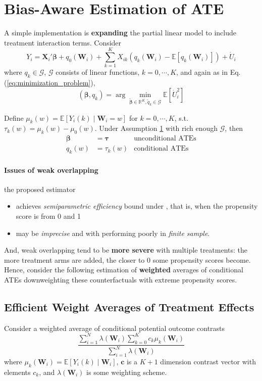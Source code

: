 \documentclass[twoside]{article}
\begin{document}
\section{Bias-Aware Estimation of ATE}
A simple implementation is \textbf{expanding} the partial linear model to include treatment interaction terms. Consider
\begin{equation}\label{eq:expanded_ATE_estimation}
    Y_i = \mathbf{X}_i'\boldsymbol{\beta} + q_0(\mathbf{W}_i) + \sum^K_{k=1}X_{ik}\left(q_k(\mathbf{W}_i)-\mathbb{E}\left[ q_k(\mathbf{W}_i) \right]\right) + \dot{U}_i
\end{equation}
where $q_k\in \mathcal{G}$, $\mathcal{G}$ consists of linear functions, $k=0,\cdots,K$, and again as in Eq. (\ref{eq:minimization_problem}), 
$$
(\boldsymbol{\beta},q_k) = \arg\min_{\tilde{\boldsymbol{\beta}}\in \mathbb{R}^K,\tilde{q}_k\in \mathcal{G}} \mathbb{E}\left[ \dot{U}_i^2 \right]
$$

Define $\mu_k(w) = \mathbb{E}\left[Y_i(k)\mid \mathbf{W}_i = w\right]$ for $k=0,\cdots,K$, s.t. $\tau_k(w) = \mu_k(w)-\mu_0(w)$. Under Assumption \hyperref[assumption1]{1} with rich enough $\mathcal{G}$, then 
\begin{align*}
    \boldsymbol{\beta} &= \boldsymbol{\tau} & \text{unconditional ATEs} \\
    q_k(w) &= \tau_k(w) & \text{conditional ATEs}
\end{align*}

\paragraph*{Issues of weak overlapping} the proposed estimator 
\begin{itemize}
    \item achieves {\textit{semiparametric efficiency}} bound under , that is, when the propensity score is  from 0 and 1
    \item may be \textit{imprecise} and with performing poorly in \textit{finite sample}.
\end{itemize}
And, weak overlapping tend to be \textbf{more severe} with multiple treatments: the more treatment arms are added, the closer to 0 some propensity scores become. Hence, consider the following estimation of \textbf{weighted} averages of conditional ATEs downweighting these counterfactuals with extreme propensity scores.

\subsection{Efficient Weight Averages of Treatment Effects}
Consider a weighted average of conditional potential outcome contrasts
$$
\frac{\sum^N_{i=1}\lambda(\mathbf{W}_i)\sum^K_{k=0} c_k\mu_k(\mathbf{W}_i)}{\sum^N_{i=1}\lambda(\mathbf{W}_i)}
$$
where $\mu_k(\mathbf{W}_i) = \mathbb{E}\left[Y_i(k)\mid \mathbf{W}_i\right]$, $\mathbf{c}$ is a $K+1$ dimension contrast vector with elements $c_k$, and $\lambda (\mathbf{W}_i)$ is some weighting scheme.
\end{document}
